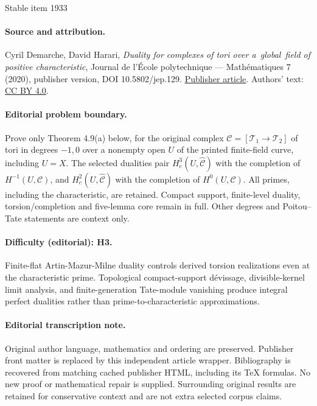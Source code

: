 \documentclass[11pt]{article}
\let\mathcal\mathscr
\theoremstyle{plain}
\theoremstyle{definition}
\begin{document}
\begin{center}{\Large Stable item 1933}\end{center}
\paragraph{Source and attribution.}
Cyril Demarche, David Harari, \emph{Duality for complexes of tori over a global field of positive characteristic}, Journal de l’École polytechnique — Mathématiques 7 (2020), publisher version, DOI 10.5802/jep.129. \href{https://jep.centre-mersenne.org/articles/10.5802/jep.129/}{Publisher article}. Authors' text: \href{https://creativecommons.org/licenses/by/4.0/}{CC BY 4.0}.
\paragraph{Editorial problem boundary.}
Prove only Theorem 4.9(a) below, for the original complex \(\mathcal C=[\mathcal T_1\to\mathcal T_2]\) of tori in degrees \(-1,0\) over a nonempty open \(U\) of the printed finite-field curve, including \(U=X\). The selected dualities pair \(H_c^3(U,\widehat{\mathcal C})\) with the completion of \(H^{-1}(U,\mathcal C)\), and \(H_c^2(U,\widehat{\mathcal C})\) with the completion of \(H^0(U,\mathcal C)\). All primes, including the characteristic, are retained. Compact support, finite-level duality, torsion/completion and five-lemma core remain in full. Other degrees and Poitou--Tate statements are context only.
\paragraph{Difficulty (editorial): H3.}
Finite-flat Artin-Mazur-Milne duality controls derived torsion realizations even at the characteristic prime. Topological compact-support dévissage, divisible-kernel limit analysis, and finite-generation Tate-module vanishing produce integral perfect dualities rather than prime-to-characteristic approximations.
\paragraph{Editorial transcription note.}
Original author language, mathematics and ordering are preserved. Publisher front matter is replaced by this independent article wrapper. Bibliography is recovered from matching cached publisher HTML, including its TeX formulas. No new proof or mathematical repair is supplied. Surrounding original results are retained for conservative context and are not extra selected corpus claims.
\clearpage
\end{document}
